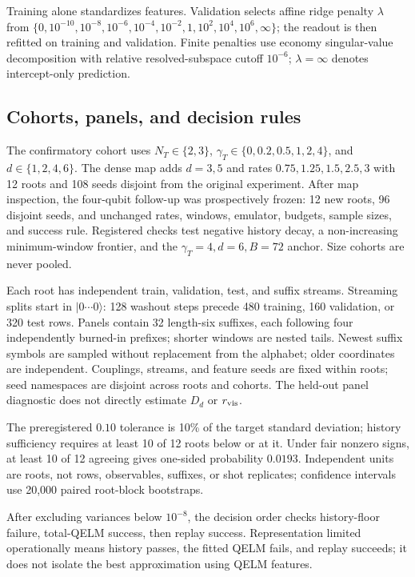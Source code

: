 Training alone standardizes features. Validation selects affine ridge
penalty $\lambda$ from
$\{0,10^{-10},10^{-8},10^{-6},10^{-4},10^{-2},1,10^2,10^4,10^6,\infty\}$;
the readout is then refitted on training and validation. Finite penalties
use economy singular-value decomposition with relative resolved-subspace
cutoff $10^{-6}$; $\lambda=\infty$ denotes intercept-only prediction.

\subsection{Cohorts, panels, and decision rules}

The confirmatory cohort uses $N_T\in\{2,3\}$,
$\gamma_T\in\{0,0.2,0.5,1,2,4\}$, and $d\in\{1,2,4,6\}$.
The dense map adds $d=3,5$ and rates $0.75,1.25,1.5,2.5,3$ with
12 roots and 108 seeds disjoint from the original experiment.
After map inspection, the four-qubit follow-up was prospectively frozen:
12 new roots, 96 disjoint seeds, and unchanged rates, windows, emulator,
budgets, sample sizes, and success rule. Registered checks test negative
history decay, a non-increasing minimum-window frontier, and the
$\gamma_T=4,d=6,B=72$ anchor. Size cohorts are never pooled.

Each root has independent train, validation, test, and suffix streams.
Streaming splits start in $|0\cdots0\rangle$: 128 washout steps precede
480 training, 160 validation, or 320 test rows. Panels contain 32 length-six
suffixes, each following four independently burned-in prefixes; shorter
windows are nested tails. Newest suffix symbols are sampled without replacement
from the alphabet; older coordinates are independent. Couplings, streams,
and feature seeds are fixed within roots; seed namespaces are disjoint across
roots and cohorts. The held-out panel diagnostic does not directly estimate
$D_d$ or $r_{\rm vis}$.

The preregistered $0.10$ tolerance is 10\% of the target standard deviation;
history sufficiency requires at least 10 of 12 roots below or at it.
Under fair nonzero signs, at least 10 of 12 agreeing gives one-sided
probability $0.0193$. Independent units are roots, not rows, observables,
suffixes, or shot replicates; confidence intervals use 20,000 paired
root-block bootstraps.

After excluding variances below $10^{-8}$, the decision order checks
history-floor failure, total-QELM success, then replay success.
Representation limited operationally means history passes, the fitted QELM
fails, and replay succeeds; it does not isolate the best approximation using
QELM features.


